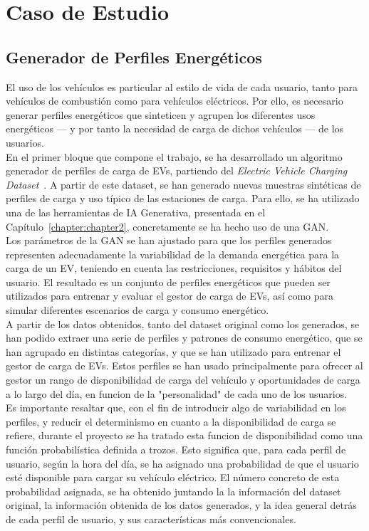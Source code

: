 \chapter{Caso de Estudio}
\section{Generador de Perfiles Energéticos}
El uso de los vehículos es particular al estilo de vida de cada usuario, tanto para vehículos de
combustión como para vehículos eléctricos. Por ello, es necesario generar perfiles energéticos que
sinteticen y agrupen los diferentes usos energéticos — y por tanto la necesidad de carga de dichos
vehículos — de los usuarios.\\

En el primer bloque que compone el trabajo, se ha desarrollado un algoritmo generador de perfiles 
de carga de EVs, partiendo del \textit{Electric Vehicle Charging Dataset}~\cite{kaggle_ev_charging_patterns}.
A partir de este dataset, se han generado nuevas muestras sintéticas de perfiles de carga y uso 
típico de las estaciones de carga. Para ello, se ha utilizado una de las herramientas de IA 
Generativa, presentada en el Capítulo~\ref{chapter:chapter2}, concretamente se ha hecho uso de una
GAN.\\

Los parámetros de la GAN se han ajustado para que los perfiles generados representen adecuadamente
la variabilidad de la demanda energética para la carga de un EV, teniendo en cuenta las restricciones,
requisitos y hábitos del usuario. El resultado es un conjunto de perfiles energéticos que pueden
ser utilizados para entrenar y evaluar el gestor de carga de EVs, así como para simular diferentes
escenarios de carga y consumo energético.\\

A partir de los datos obtenidos, tanto del dataset original como los generados, se han podido 
extraer una serie de perfiles y patrones de consumo energético, que se han agrupado en distintas 
categorías, y que se han utilizado para entrenar el gestor de carga de EVs. Estos perfiles se han
usado principalmente para ofrecer al gestor un rango de disponibilidad de carga del vehículo y 
oportunidades de carga a lo largo del día, en funcion de la "personalidad" de cada uno de los 
usuarios.\\

Es importante resaltar que, con el fin de introducir algo de variabilidad en los perfiles, y reducir
el determinismo en cuanto a la disponibilidad de carga se refiere, durante el proyecto se ha 
tratado esta funcion de disponibilidad como una función probabilística definida a trozos. Esto 
significa que, para cada perfil de usuario, según la hora del día, se ha asignado una probabilidad
de que el usuario esté disponible para cargar su vehículo eléctrico. El número concreto de esta
probabilidad asignada, se ha obtenido juntando la la información del dataset original, la 
información obtenida de los datos generados, y la idea general detrás de cada perfil de usuario, y
sus características más convencionales.\\

